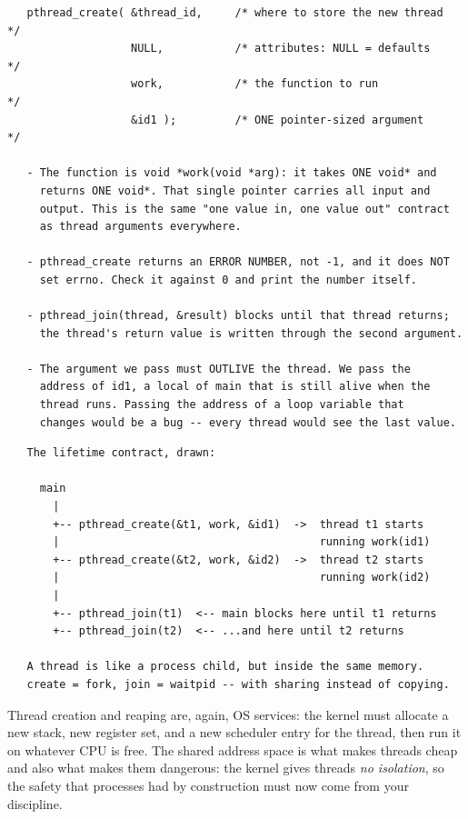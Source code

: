 \begin{verbatim}
   pthread_create( &thread_id,     /* where to store the new thread  */
                   NULL,           /* attributes: NULL = defaults    */
                   work,           /* the function to run            */
                   &id1 );         /* ONE pointer-sized argument     */

   - The function is void *work(void *arg): it takes ONE void* and
     returns ONE void*. That single pointer carries all input and
     output. This is the same "one value in, one value out" contract
     as thread arguments everywhere.

   - pthread_create returns an ERROR NUMBER, not -1, and it does NOT
     set errno. Check it against 0 and print the number itself.

   - pthread_join(thread, &result) blocks until that thread returns;
     the thread's return value is written through the second argument.

   - The argument we pass must OUTLIVE the thread. We pass the
     address of id1, a local of main that is still alive when the
     thread runs. Passing the address of a loop variable that
     changes would be a bug -- every thread would see the last value.
\end{verbatim}

\begin{verbatim}
   The lifetime contract, drawn:

     main
       |
       +-- pthread_create(&t1, work, &id1)  ->  thread t1 starts
       |                                        running work(id1)
       +-- pthread_create(&t2, work, &id2)  ->  thread t2 starts
       |                                        running work(id2)
       |
       +-- pthread_join(t1)  <-- main blocks here until t1 returns
       +-- pthread_join(t2)  <-- ...and here until t2 returns

   A thread is like a process child, but inside the same memory.
   create = fork, join = waitpid -- with sharing instead of copying.
\end{verbatim}

\begin{osconcept}
Thread creation and reaping are, again, OS services: the kernel must
allocate a new stack, new register set, and a new scheduler entry for
the thread, then run it on whatever CPU is free. The shared address
space is what makes threads cheap and also what makes them dangerous:
the kernel gives threads \emph{no isolation}, so the safety that
processes had by construction must now come from your discipline.
\end{osconcept}

